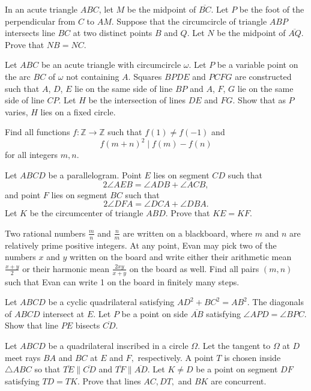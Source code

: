 \documentclass[11pt]{scrartcl}
\begin{document}
\begin{problem}[9137209985622350774]
	In an acute triangle $ABC$, let $M$ be the midpoint of $\overline{BC}$. Let $P$ be the foot of the perpendicular from $C$ to $AM$. Suppose that the circumcircle of triangle $ABP$ intersects line $BC$ at two distinct points $B$ and $Q$. Let $N$ be the midpoint of $\overline{AQ}$. Prove that $NB=NC$.
\end{problem}
\begin{problem}[8700998965901287095]
Let \(ABC\) be an acute triangle with circumcircle \(\omega\). Let \(P\) be a variable point on the arc \(BC\) of \(\omega\) not containing \(A\). Squares \(BPDE\) and \(PCFG\) are constructed such that \(A\), \(D\), \(E\) lie on the same side of line \(BP\) and \(A\), \(F\), \(G\) lie on the same side of line \(CP\). Let \(H\) be the intersection of lines \(DE\) and \(FG\). Show that as \(P\) varies, \(H\) lies on a fixed circle.
\end{problem}
\begin{problem}[8705251856251359603]
Find all functions $f:\mathbb{Z} \rightarrow \mathbb{Z}$ such that $f(1) \neq f(-1)$ and$$f(m+n)^2 \mid f(m)-f(n)$$for all integers $m, n$.
\end{problem}
\begin{problem}[6190379360381554657]
	Let $ABCD$ be a parallelogram. Point $E$ lies on segment $CD$ such that\[2\angle AEB=\angle ADB+\angle ACB,\]and point $F$ lies on segment $BC$ such that\[2\angle DFA=\angle DCA+\angle DBA.\]Let $K$ be the circumcenter of triangle $ABD$. Prove that $KE=KF$.
\end{problem}
\begin{problem}[545015136325290]
	Two rational numbers \(\tfrac{m}{n}\) and \(\tfrac{n}{m}\) are written on a blackboard, where \(m\) and \(n\) are relatively prime positive integers. At any point, Evan may pick two of the numbers \(x\) and \(y\) written on the board and write either their arithmetic mean \(\tfrac{x+y}{2}\) or their harmonic mean \(\tfrac{2xy}{x+y}\) on the board as well. Find all pairs \((m,n)\) such that Evan can write 1 on the board in finitely many steps.
\end{problem}
\begin{problem}[287986230573307]
Let $ABCD$ be a cyclic quadrilateral satisfying $AD^2 + BC^2 = AB^2$. The diagonals of $ABCD$ intersect at $E$. Let $P$ be a point on side $\overline{AB}$ satisfying $\angle APD = \angle BPC$. Show that line $PE$ bisects $\overline{CD}$.
\end{problem}
\begin{problem}[8851048763094130212]
	Let $ABCD$ be a quadrilateral inscribed in a circle $\Omega.$ Let the tangent to $\Omega$ at $D$ meet rays $BA$ and $BC$ at $E$ and $F,$ respectively. A point $T$ is chosen inside $\triangle ABC$ so that $\overline{TE}\parallel\overline{CD}$ and $\overline{TF}\parallel\overline{AD}.$ Let $K\ne D$ be a point on segment $DF$ satisfying $TD=TK.$ Prove that lines $AC,DT,$ and $BK$ are concurrent.
\end{problem}
\end{document}
